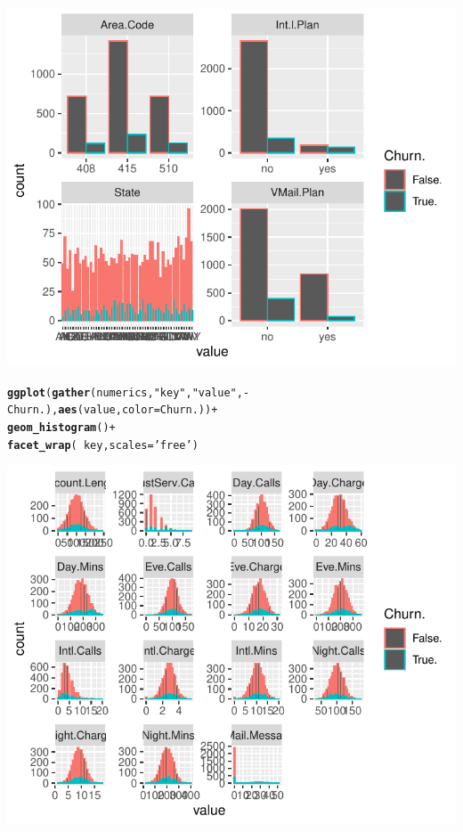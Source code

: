 \documentclass{article}\usepackage[]{graphicx}\usepackage[]{color}
\makeatletter
\def\maxwidth{ %
  \ifdim\Gin@nat@width>\linewidth
    \linewidth
  \else
    \Gin@nat@width
  \fi
}
\newcommand{\hlstr}[1]{\textcolor[rgb]{0.192,0.494,0.8}{#1}}%
\newcommand{\hlopt}[1]{\textcolor[rgb]{0,0,0}{#1}}%
\newcommand{\hlstd}[1]{\textcolor[rgb]{0.345,0.345,0.345}{#1}}%
\newcommand{\hlkwc}[1]{\textcolor[rgb]{0.333,0.667,0.333}{#1}}%
\newcommand{\hlkwd}[1]{\textcolor[rgb]{0.737,0.353,0.396}{\textbf{#1}}}%
\newenvironment{kframe}{%
 \def\at@end@of@kframe{}%
 \ifinner\ifhmode%
  \def\at@end@of@kframe{\end{minipage}}%
  \begin{minipage}{\columnwidth}%
 \fi\fi%
 \def\FrameCommand##1{\hskip\@totalleftmargin \hskip-\fboxsep
 \colorbox{shadecolor}{##1}\hskip-\fboxsep
     \hskip-\linewidth \hskip-\@totalleftmargin \hskip\columnwidth}%
 \MakeFramed {\advance\hsize-\width
   \@totalleftmargin\z@ \linewidth\hsize
   \@setminipage}}%
 {\par\unskip\endMakeFramed%
 \at@end@of@kframe}
\newenvironment{knitrout}{}{} %
\makeatother
\begin{document}
\begin{description}
\begin{knitrout}
{\centering \includegraphics[width=\maxwidth]{figure/Overviews_plots_grouped-1} 

}


\begin{kframe}\begin{alltt}
\hlkwd{ggplot}\hlstd{(}\hlkwd{gather}\hlstd{(numerics,} \hlstr{"key"}\hlstd{,} \hlstr{"value"}\hlstd{,} \hlopt{-}\hlstd{Churn.),} \hlkwd{aes}\hlstd{(value,} \hlkwc{color}\hlstd{=Churn.))} \hlopt{+}
  \hlkwd{geom_histogram}\hlstd{()} \hlopt{+}
  \hlkwd{facet_wrap}\hlstd{(}\hlopt{~}\hlstd{key,} \hlkwc{scales}\hlstd{=}\hlstr{'free'}\hlstd{)}
\end{alltt}
\end{kframe}

{\centering \includegraphics[width=\maxwidth]{figure/Overviews_plots_grouped-2} 

}
\end{knitrout}
\end{description}
\end{document}
